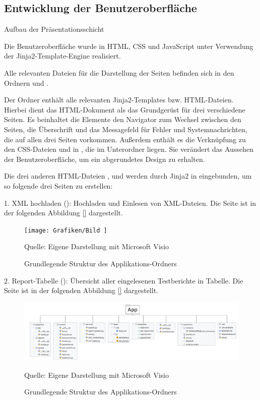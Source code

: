 \subsection{Entwicklung der Benutzeroberfläche}
\label{subsec:entwicklung-der-benutzeroberflache}
Aufbau der Präsentationsschicht


Die Benutzeroberfläche wurde in HTML, CSS und JavaScript unter Verwendung der Jinja2-Template-Engine realisiert.

Alle relevanten Dateien für die Darstellung der Seiten befinden sich in den Ordnern  und .

Der Ordner  enthält alle relevanten Jinja2-Templates bzw. HTML-Dateien.
Hierbei dient das HTML-Dokument  als das Grundgerüst für drei verschiedene Seiten.
Es beinhaltet die Elemente den Navigator zum Wechsel zwischen den Seiten, die Überschrift und das Messagefeld für Fehler und Systemnachrichten, die auf allen drei Seiten vorkommen.
Außerdem enthält es die Verknüpfung zu den CSS-Dateien  und  in , die im Unterordner  liegen.
Sie verändert das Aussehen der Benutzeroberfläche, um ein abgerundetes Design zu erhalten.

Die drei anderen HTML-Dateien ,  und  werden durch Jinja2 in  eingebunden, um so folgende drei Seiten zu erstellen:

1. XML hochladen (): Hochladen und Einlesen von XML-Dateien.
Die Seite ist in der folgenden Abbildung \ref{} dargestellt.

\begin{figure}[H]
    \centering
    \texttt{[image: Grafiken/Bild ]}
    \caption{Grundlegende Struktur des Applikations-Ordners}
    \label{fig: }
    {Quelle: Eigene Darstellung mit Microsoft Visio}
\end{figure}

2. Report-Tabelle (): Übersicht aller eingelesenen Testberichte in Tabelle.
Die Seite ist in der folgenden Abbildung \ref{} dargestellt.

\begin{figure}[H]
    \centering
    \includegraphics[width=1\textwidth]{Grafiken/Min Ordnerstruktur Projekt}
    \caption{Grundlegende Struktur des Applikations-Ordners}
    \label{fig: }
    {Quelle: Eigene Darstellung mit Microsoft Visio}
\end{figure}

